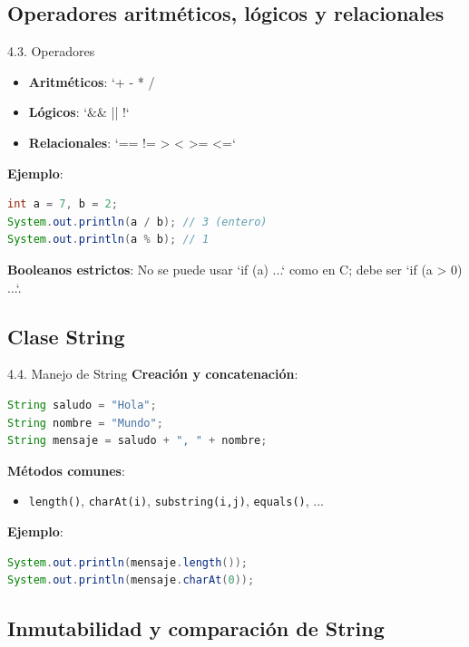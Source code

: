 \documentclass{beamer}
\begin{document}
\subsection{Operadores aritméticos, lógicos y relacionales}

\begin{frame}[fragile]{4.3. Operadores}
\begin{itemize}
    \item \textbf{Aritméticos}: `+ - * / %
    \item \textbf{Lógicos}: `&& || !`  
    \item \textbf{Relacionales}: `== != > < >= <=`
\end{itemize}

\textbf{Ejemplo}:
\begin{lstlisting}[language=Java]
int a = 7, b = 2;
System.out.println(a / b); // 3 (entero)
System.out.println(a % b); // 1
\end{lstlisting}

\textbf{Booleanos estrictos}:  
No se puede usar `if (a) {...}` como en C; debe ser `if (a > 0) {...}`.
\end{frame}

\subsection{Clase String}

\begin{frame}[fragile]{4.4. Manejo de String}
\textbf{Creación y concatenación}:
\begin{lstlisting}[language=Java]
String saludo = "Hola";
String nombre = "Mundo";
String mensaje = saludo + ", " + nombre;
\end{lstlisting}

\textbf{Métodos comunes}:
\begin{itemize}
  \item \texttt{length()}, \texttt{charAt(i)}, \texttt{substring(i,j)}, \texttt{equals()}, ...
\end{itemize}

\textbf{Ejemplo}:
\begin{lstlisting}[language=Java]
System.out.println(mensaje.length());
System.out.println(mensaje.charAt(0));
\end{lstlisting}
\end{frame}

\subsection{Inmutabilidad y comparación de String}
\end{document}
